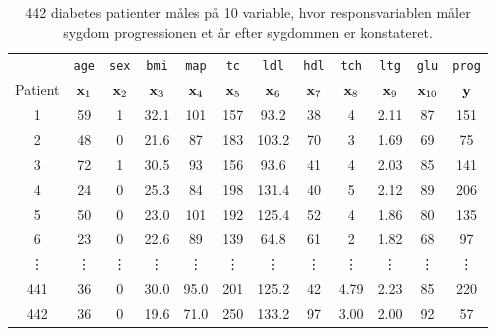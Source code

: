 \begin{table}[H] 
\centering 
\begin{tabular}{cccccccccccc} 
& \texttt{age} & \texttt{sex} & \texttt{bmi} & \texttt{map} & \texttt{tc} & \texttt{ldl} & \texttt{hdl} & \texttt{tch} & \texttt{ltg} &  \texttt{glu} & \texttt{prog} \\
\cline{6-11}
Patient & \(\mathbf{x}_1\) & \(\mathbf{x}_2\) & \(\mathbf{x}_3\) & \(\mathbf{x}_4\) & \(\mathbf{x}_5\) & \(\mathbf{x}_6\) & \(\mathbf{x}_7\) & \(\mathbf{x}_8\) & \(\mathbf{x}_9\) & \(\mathbf{x}_{10}\) & \(\mathbf{y}\) \\
\midrule
1 & 59 &  1 & 32.1 & 101 & 157 & 93.2 & 38 &  4 & 2.11 & 87 & 151 \\
2 & 48 &  0 & 21.6 & 87 & 183 & 103.2 & 70  & 3 & 1.69 & 69  & 75 \\
3 & 72 &  1 & 30.5 & 93 & 156 & 93.6 & 41  & 4 & 2.03 & 85 & 141 \\
4 & 24  & 0 & 25.3 & 84 & 198 & 131.4 & 40 &  5 & 2.12 & 89 & 206 \\
5 & 50  & 0 & 23.0 & 101 & 192 & 125.4 & 52 &  4 & 1.86 & 80 & 135 \\
6 & 23 &  0 & 22.6 & 89 & 139 & 64.8 & 61 &  2 & 1.82 & 68 &  97 \\
\vdots & \vdots & \vdots & \vdots & \vdots & \vdots & \vdots & \vdots & \vdots & \vdots & \vdots & \vdots \\
441 & 36  & 0 & 30.0 & 95.0 & 201 & 125.2 & 42 & 4.79 & 2.23 & 85 & 220 \\
442 & 36 & 0 & 19.6 & 71.0 & 250 & 133.2 & 97 & 3.00 & 2.00 & 92 &  57 \\ \bottomrule
\end{tabular}  
\caption{442 diabetes patienter måles på 10 variable, hvor responsvariablen måler sygdom progressionen et år efter sygdommen er konstateret.} \label{tab:diabetes} 
\end{table} 